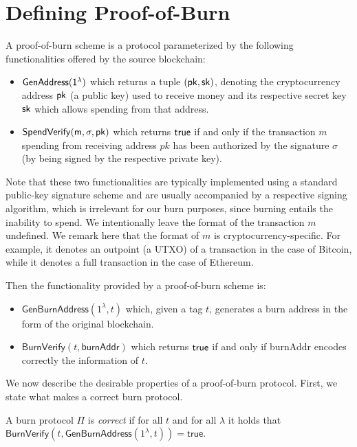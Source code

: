 \section{Defining Proof-of-Burn}

A proof-of-burn scheme is a protocol parameterized by the following functionalities offered by the source blockchain:

\begin{itemize}
  \item $\sf{GenAddress}(1^\lambda)$ which returns a tuple $(\sf{pk}, \sf{sk})$, denoting the cryptocurrency address $\sf{pk}$ (a public key) used to receive money and its respective secret key $\sf{sk}$ which allows spending from that address.

  \item $\sf{SpendVerify}(m, \sigma, pk)$ which returns $\sf{true}$ if and only if the transaction $m$ spending from receiving address $pk$ has been authorized by the signature $\sigma$ (by being signed by the respective private key).
\end{itemize}

Note that these two functionalities are typically implemented using a standard public-key signature scheme and are usually accompanied by a respective signing algorithm, which is irrelevant for our burn purposes, since burning entails the inability to spend. We intentionally leave the format of the transaction $m$ undefined. We remark here that the format of $m$ is cryptocurrency-specific. For example, it denotes an outpoint (a UTXO) of a transaction in the case of Bitcoin, while it denotes a full transaction in the case of Ethereum.

Then the functionality provided by a proof-of-burn scheme is:

\begin{itemize}
  \item $\mathsf{GenBurnAddress}(1^\lambda, t)$ which, given a tag $t$, generates a burn address in the form of the original blockchain.

  \item $\mathsf{BurnVerify}(t, \mathsf{burnAddr})$ which returns $\sf{true}$ if and only if \textsf{burnAddr} encodes correctly the information of $t$.
\end{itemize}

We now describe the desirable properties of a proof-of-burn protocol. First, we state what makes a correct burn protocol.

\begin{definition}[Correctness]
  A burn protocol $\Pi$ is \emph{correct} if for all $t$ and for all $\lambda$ it holds that
  $\mathsf{BurnVerify}(t, \mathsf{GenBurnAddress}(1^\lambda, t)) = \textsf{true}$.
\end{definition}

